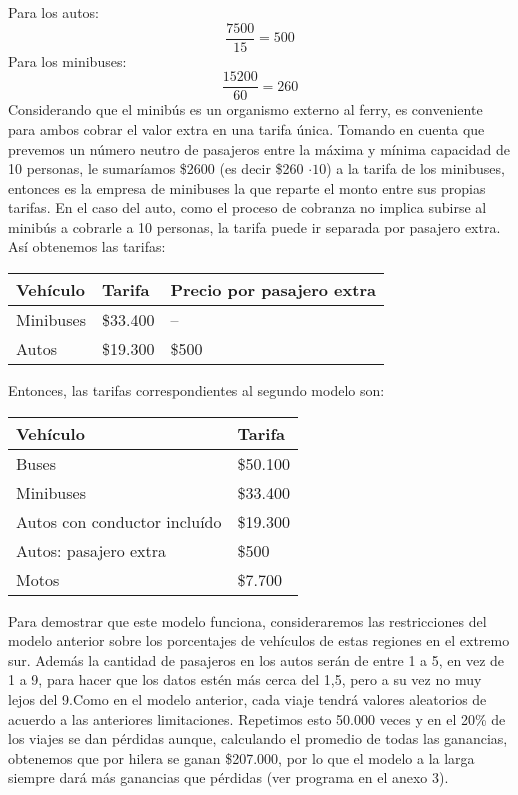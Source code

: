 \documentclass[a4paper]{article}
\begin{document}
Para los autos:
\begin{equation*}
    \frac{7500}{15}=500
\end{equation*}
Para los minibuses:
\begin{equation*}
    \frac{15200}{60}=260
\end{equation*}
Considerando que el minibús es un organismo externo al ferry, es conveniente para ambos cobrar el valor extra en una tarifa única. Tomando en cuenta que prevemos un número neutro de pasajeros entre la máxima y mínima capacidad de 10 personas, le sumaríamos \$2600 (es decir \$260 $\cdot 10$) a la tarifa de los minibuses, entonces es la empresa de minibuses la que reparte el monto entre sus propias tarifas. En el caso del auto, como el proceso de cobranza no implica subirse al minibús a cobrarle a 10 personas, la tarifa puede ir separada por pasajero extra.
\newline\newline Así obtenemos las tarifas: 
\begin{table}[h]
    \centering
    \begin{tabular}{|M{2cm}|M{2cm}|M{2cm}|}
      \hline
      Vehículo   &Tarifa &  Precio por pasajero extra\\
      \hline
      Minibuses   &\$33.400 &  --\\
      \hline
       Autos   &\$19.300 &  \$500\\
       \hline
    \end{tabular}
\end{table}\newline 
Entonces, las tarifas correspondientes al segundo modelo son:
\begin{table}[h]
    \centering
    \begin{tabular}{|M{4cm}|M{4cm}|}
      \hline
      Vehículo   &Tarifa \\
      \hline
      Buses   &\$50.100 \\
      \hline
      Minibuses   &\$33.400\\
      \hline
      Autos con conductor incluído   &\$19.300 \\
      \hline
     Autos: pasajero extra   &\$500 \\
      \hline
      Motos   &\$7.700\\
       \hline
    \end{tabular}
\end{table}\newline Para demostrar que este modelo funciona, consideraremos las restricciones del modelo anterior sobre los porcentajes de vehículos de estas regiones en el extremo sur. Además la cantidad de pasajeros en los autos serán de entre 1 a 5, en vez de 1 a 9, para hacer que los datos estén más cerca del 1,5,  pero a su vez no muy lejos del 9.\newline\newline Como en el modelo anterior, cada viaje tendrá valores aleatorios de acuerdo a las anteriores limitaciones. Repetimos esto 50.000 veces y en el 20\% de los viajes se dan pérdidas aunque, calculando el promedio de todas las ganancias, obtenemos que por hilera se ganan \$207.000, por lo que el modelo a la larga siempre dará más ganancias que pérdidas (ver programa en el anexo 3).
\end{document}
